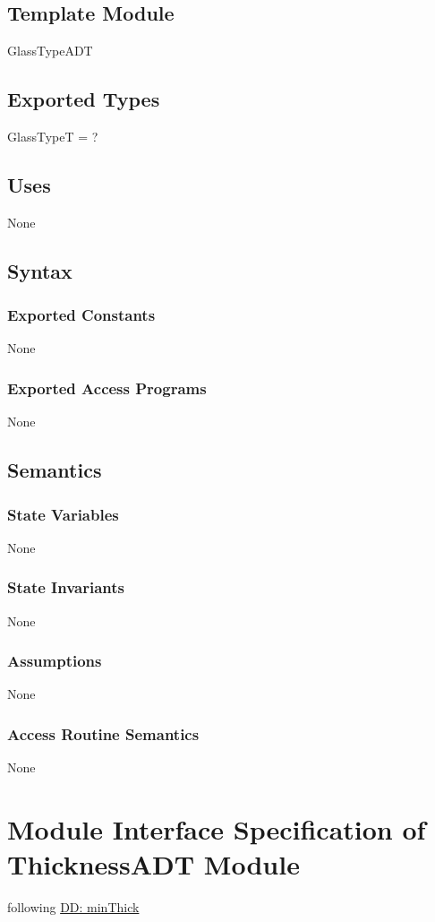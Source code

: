 \documentclass[12pt]{article}
\begin{document}
\subsection{Template Module}
\label{Sec:TemplateModule}
GlassTypeADT
\subsection{Exported Types}
\label{Sec:ExpTypes}
GlassTypeT = ?
\subsection{Uses}
\label{Sec:Uses}
None
\subsection{Syntax}
\label{Sec:Syntax}
\subsubsection{Exported Constants}
\label{Sec:ExpConstants}
None
\subsubsection{Exported Access Programs}
\label{Sec:ExpAccPrograms}
None
\subsection{Semantics}
\label{Sec:Semantics}
\subsubsection{State Variables}
\label{Sec:StateVars}
None
\subsubsection{State Invariants}
\label{Sec:StateInvars}
None
\subsubsection{Assumptions}
\label{Sec:Assumps}
None
\subsubsection{Access Routine Semantics}
\label{Sec:AccRoutSemantics}
None
\section{Module Interface Specification of ThicknessADT Module}
\label{Sec:ThicknessADT}
following \hyperref[DD:minThick]{DD: minThick}
\end{document}
